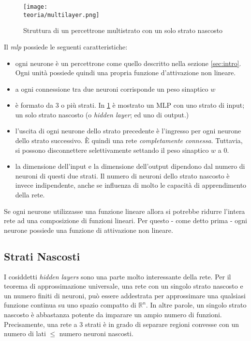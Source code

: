 \begin{figure}[h!]
 \centering
 \texttt{[image: \\teoria/multilayer.png]}
 \caption{Struttura di un percettrone multistrato con un solo strato nascosto}
 \label{fig:multilayer}
\end{figure}


Il \emph{mlp} possiede le seguenti caratteristiche: 
\begin{itemize}
\item ogni neurone è un percettrone come quello descritto nella sezione \ref{sec:intro}. Ogni unità possiede quindi una propria funzione d'attivazione non lineare.
\item a ogni connessione tra due neuroni corrisponde un peso sinaptico $w$
\item è formato da 3 o più strati. In \ref{fig:multilayer} è mostrato un MLP con uno strato di input; un solo strato nascosto (o \emph{hidden layer}; ed uno di output.) 
\item l'uscita di ogni neurone dello strato precedente è l'ingresso per ogni neurone dello
strato successivo. È quindi una rete \emph{completamente connessa}. Tuttavia, si possono
disconnettere selettivamente settando il peso sinaptico $w$ a 0.
\item la dimensione dell'input e la dimensione dell'output dipendono dal numero di
neuroni di questi due strati. Il numero di neuroni dello strato nascosto è invece
indipendente, anche se influenza di molto le capacità di apprendimento della rete. 
\end{itemize}
Se ogni neurone utilizzasse una funzione lineare allora si potrebbe ridurre l'intera rete ad una composizione di funzioni lineari. Per questo - come detto prima - ogni neurone possiede una funzione di attivazione non lineare. 

\subsection{Strati Nascosti}
I cosiddetti \emph{hidden layers} sono una parte molto interessante della rete. Per il teorema di
approssimazione universale\parencite{WApprox}, \cite{WApprox} \parencite{WConnessionismo} una rete con un singolo strato nascosto e un numero finiti di
neuroni, può essere addestrata per approssimare una qualsiasi funzione continua su uno spazio compatto di $\mathbb{R}^n$. In altre parole, un singolo strato nascosto è abbastanza potente da imparare un ampio numero di funzioni. Precisamente, una rete a 3 strati è in grado di separare regioni convesse con un numero di lati $\leqslant$ numero neuroni nascosti. 

